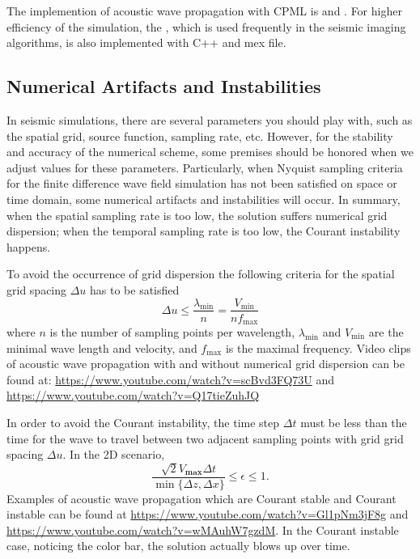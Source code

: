 \documentclass[11pt]{article}
\theoremstyle{plain}
\theoremstyle{definition}
\theoremstyle{remark}
\numberwithin{equation}{section}
\begin{document}
The implemention of acoustic wave propagation with CPML is  and .
For higher efficiency of the simulation, the , which is used frequently in the seismic imaging algorithms, is also implemented with C++ and mex file. 

\subsection{Numerical Artifacts and Instabilities}
In seismic simulations, there are several parameters you should play with, such as the spatial grid, source function, sampling rate, etc. However, 
for the stability and accuracy of the numerical scheme, some premises should be honored when we adjust values for these parameters.  
Particularly, when Nyquist sampling criteria for the finite difference wave field simulation has not been satisfied on space or time domain, some numerical artifacts and instabilities will occur. In summary, when the spatial sampling rate is too low,  the solution suffers numerical grid dispersion; when the temporal sampling rate is too low, the Courant instability happens.

To avoid the occurrence of grid dispersion the following criteria for the spatial grid spacing $\Delta u$ has to be satisfied
\begin{equation}
  \Delta u \leq \frac{\lambda_{\min}}{n} = \frac{V_{\min}}{nf_{\max}}
\end{equation}
where $n$ is the number of sampling points per wavelength, $\lambda_{\min}$ and $V_{\min}$ are the minimal wave length and velocity, and $f_{\max}$ is the maximal frequency. 
Video clips of acoustic wave propagation with and without numerical grid dispersion can be found at:
\url{https://www.youtube.com/watch?v=scBvd3FQ73U} and \url{https://www.youtube.com/watch?v=Q17tieZuhJQ}

In order to avoid the Courant instability, the time step $\Delta t$ must be less than the time for the wave to travel between two 
adjacent sampling points with grid grid spacing $\Delta u$. In the 2D scenario,
\begin{equation}
\frac{\sqrt{2}V_{\textbf{max}}\Delta t}{\min\{\Delta z, \Delta x\}}\le \epsilon \le 1.
\end{equation}
Examples of acoustic wave propagation which are Courant stable and Courant instable can be found at
\url{https://www.youtube.com/watch?v=Gl1pNm3jF8g}  and \url{https://www.youtube.com/watch?v=wMAuhW7gzdM}. 
In the Courant instable case, noticing the color bar, the solution actually blows up over time.
\end{document}
